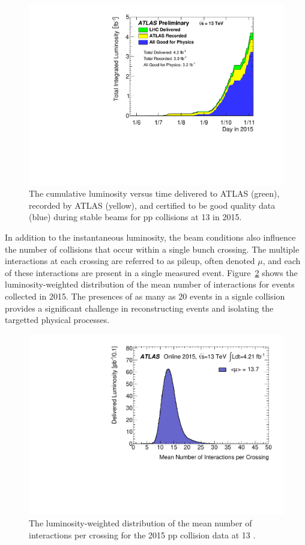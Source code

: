 \begin{figure}
\centering
\includegraphics[width=\fullfig]{figures/lumi_2015.pdf}
\caption{The cumulative luminosity versus time delivered to ATLAS (green), recorded by ATLAS (yellow), and certified to be good quality data (blue) during stable beams for pp collisions at 13 \TeV in 2015.}
\label{fig:lumi_2015}
\end{figure}

In addition to the instantaneous luminosity, the beam conditions also influence the number of collisions that occur within a single bunch crossing. 
The multiple interactions at each crossing are referred to as pileup, often denoted $\mu$, and each of these interactions are present in a single measured event.
Figure~\ref{fig:mu_2015} shows the luminosity-weighted distribution of the mean number of interactions for events collected in 2015.
The presences of as many as 20 events in a signle collision provides a significant challenge in reconstructing events and isolating the targetted physical processes. 

\begin{figure}
\centering
\includegraphics[width=\fullfig]{figures/mu_2015.pdf}
\caption{The luminosity-weighted distribution of the mean number of interactions per crossing for the 2015 pp collision data at 13 \TeV.}
\label{fig:mu_2015}
\end{figure}
